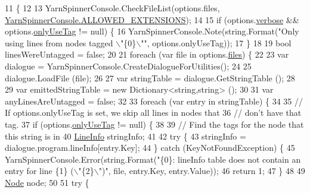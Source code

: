 \begin{DoxyCode}
11         \{
12 
13             YarnSpinnerConsole.CheckFileList(options.files, 
      \hyperlink{a00169_a0979de7ea02c8c0375b8220a12e6575e}{YarnSpinnerConsole.ALLOWED\_EXTENSIONS});
14 
15             \textcolor{keywordflow}{if} (options.\hyperlink{a00020_ada4d83d1756918f362d55f6649b82b17}{verbose} && options.\hyperlink{a00083_a8b30c1b7fb1b74eae455a568c1024b3d}{onlyUseTag} != null) \{
16                 YarnSpinnerConsole.Note(string.Format(\textcolor{stringliteral}{"Only using lines from nodes tagged \(\backslash\)"\{0\}\(\backslash\)""}, 
      options.onlyUseTag));
17             \}
18 
19             \textcolor{keywordtype}{bool} linesWereUntagged = \textcolor{keyword}{false};
20 
21             \textcolor{keywordflow}{foreach} (var file \textcolor{keywordflow}{in} options.\hyperlink{a00020_aa93cbb1bc1d5328e0a417012621e92d2}{files}) \{
22 
23                 var dialogue = YarnSpinnerConsole.CreateDialogueForUtilities();
24 
25                 dialogue.LoadFile (file);
26 
27                 var stringTable = dialogue.GetStringTable ();
28 
29                 var emittedStringTable = \textcolor{keyword}{new} Dictionary<string,string> ();
30 
31                 var anyLinesAreUntagged = \textcolor{keyword}{false};
32 
33                 \textcolor{keywordflow}{foreach} (var entry \textcolor{keywordflow}{in} stringTable) \{
34 
35                     \textcolor{comment}{// If options.onlyUseTag is set, we skip all lines in nodes that}
36                     \textcolor{comment}{// don't have that tag.}
37                     \textcolor{keywordflow}{if} (options.\hyperlink{a00083_a8b30c1b7fb1b74eae455a568c1024b3d}{onlyUseTag} != null) \{
38 
39                         \textcolor{comment}{// Find the tags for the node that this string is in}
40                         \hyperlink{a00103}{LineInfo} stringInfo;
41 
42                         \textcolor{keywordflow}{try} \{
43                             stringInfo = dialogue.program.lineInfo[entry.Key];
44                         \} \textcolor{keywordflow}{catch} (KeyNotFoundException) \{
45                             YarnSpinnerConsole.Error(string.Format(\textcolor{stringliteral}{"\{0\}: lineInfo table does not contain an
       entry for line \{1\} (\(\backslash\)"\{2\}\(\backslash\)")"}, file, entry.Key, entry.Value));
46                             \textcolor{keywordflow}{return} 1;
47                         \}
48 
49                         \hyperlink{a00029_da/de0/a00317}{Node} node;
50 
51                         \textcolor{keywordflow}{try} \{

\end{DoxyCode}
